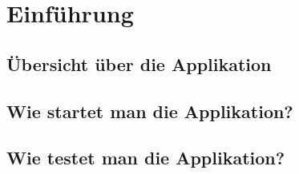\chapter{Einführung}

\section{Übersicht über die Applikation}

\section{Wie startet man die Applikation?}

\section{Wie testet man die Applikation?}
